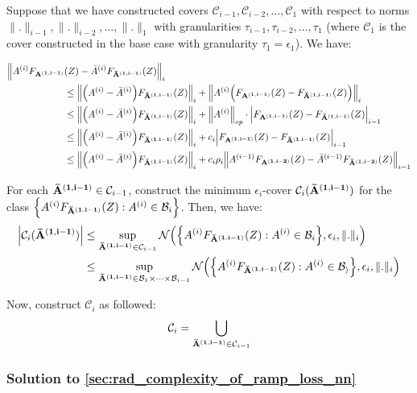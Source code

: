 \begin{proof*}
    \noindent Suppose that we have constructed covers $\mathcal{C}_{i-1}, \mathcal{C}_{i-2}, \dots, \mathcal{C}_1$ with respect to norms $\|.\|_{i-1}, \|.\|_{i-2}, \dots, \|.\|_1$ with granularities $\tau_{i-1}, \tau_{i-2}, \dots, \tau_1$ (where $\mathcal{C}_1$ is the cover constructed in the base case with granularity $\tau_1=\epsilon_1$). We have:

    \begin{align*}
        \Big\|
            A^{(i)}F_{\bf A^{(1, i-1)}}&(Z) - {\bar A}^{(i)}F_{\bf {\bar A}^{(1, i-1)}}(Z)
        \Big\|_i \\
            &\le \Big\|\Big( A^{(i)} - {\bar A}^{(i)} \Big)F_{\bf {\bar A}^{(1, i-1)}}(Z) \Big\|_i 
                + \Big\| A^{(i)}\Big( F_{\bf A^{(1, i-1)}}(Z) - F_{\bf {\bar A}^{(1, i-1)}}(Z) \Big)\Big\|_i \\
            &\le \Big\|\Big( A^{(i)} - {\bar A}^{(i)} \Big)F_{\bf {\bar A}^{(1, i-1)}}(Z) \Big\|_i 
                + \Big\|A^{(i)}\Big\|_{op} \cdot\Big| F_{\bf A^{(1, i-1)}}(Z) - F_{\bf {\bar A}^{(1, i-1)}}(Z) \Big|_{i-1} \\
            &\le \Big\|\Big( A^{(i)} - {\bar A}^{(i)} \Big)F_{\bf {\bar A}^{(1, i-1)}}(Z) \Big\|_i 
                + c_i\Big| F_{\bf A^{(1, i-1)}}(Z) - F_{\bf {\bar A}^{(1, i-1)}}(Z) \Big|_{i-1} \\
            &\le \Big\|\Big( A^{(i)} - {\bar A}^{(i)} \Big)F_{\bf {\bar A}^{(1, i-1)}}(Z) \Big\|_i 
                + c_i\rho_i\Big\| A^{(i-1)}F_{\bf A^{(1, i-2)}}(Z) - {\bar A}^{(i-1)}F_{\bf {\bar A}^{(1, i-2)}}(Z) \Big\|_{i-1} 
    \end{align*}

    \noindent For each ${\bf {\bar A}^{(1, i-1)}}\in \mathcal{C}_{i-1}$, construct the minimum $\epsilon_i$-cover $\mathcal{C}_i({\bf {\bar A}^{(1, i-1)}})$ for the class \newline$\Big\{ A^{(i)}F_{\bf {\bar A}^{(1, i-1)}}(Z) : A^{(i)} \in \mathcal{B}_i \Big\}$. Then, we have:
    \begin{align*}
        \Big| 
            \mathcal{C}_i({\bf {\bar A}^{(1, i-1)}})
         \Big| &\le \sup_{{\bf {\bar A}^{(1, i-1)}}\in\mathcal{C}_{i-1}} \mathcal{N}\Big( 
            \Big\{ 
                A^{(i)}F_{\bf {\bar A}^{(1, i-1)}}(Z) : A^{(i)}\in\mathcal{B}_i 
             \Big\}, \epsilon_i, \|.\|_i
         \Big) \\
        &\le \sup_{{\bf {\bar A}^{(1, i-1)}}\in\mathcal{B}_1\times\dots\times\mathcal{B}_{i-1}} \mathcal{N}\Big( 
            \Big\{ 
                A^{(i)}F_{\bf {\bar A}^{(1, i-1)}}(Z) : A^{(i)} \in \mathcal{B_i}
             \Big\}, \epsilon_i, \|.\|_i
         \Big)
    \end{align*}

    \noindent Now, construct $\mathcal{C}_i$ as followed:
    \begin{align*}
        \mathcal{C}_i = \bigcup_{{\bf {\bar A}^{(1, i-1)}}\in\mathcal{C}_{i-1}}
    \end{align*}
\end{proof*}


\subsubsection{Solution to \ref{sec:rad_complexity_of_ramp_loss_nn}}

